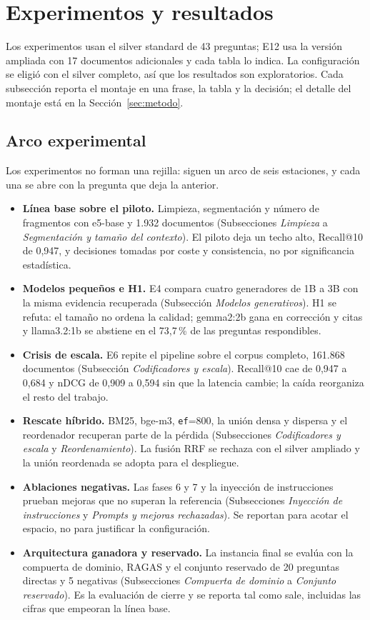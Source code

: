 \section{Experimentos y resultados}
\label{sec:experimentos}

Los experimentos usan el silver standard de 43 preguntas; E12 usa la versi\'on ampliada con 17 documentos adicionales y cada tabla lo indica. La configuraci\'on se eligi\'o con el silver completo, as\'i que los resultados son exploratorios. Cada subsecci\'on reporta el montaje en una frase, la tabla y la decisi\'on; el detalle del montaje est\'a en la Secci\'on~\ref{sec:metodo}.

\subsection{Arco experimental}

Los experimentos no forman una rejilla: siguen un arco de seis estaciones, y cada una se abre con la pregunta que deja la anterior.

\begin{itemize}
\item \textbf{L\'inea base sobre el piloto.} Limpieza, segmentaci\'on y n\'umero de fragmentos con e5-base y 1.932 documentos (Subsecciones \emph{Limpieza} a \emph{Segmentaci\'on y tama\~no del contexto}). El piloto deja un techo alto, Recall@10 de 0,947, y decisiones tomadas por coste y consistencia, no por significancia estad\'istica.
\item \textbf{Modelos peque\~nos e H1.} E4 compara cuatro generadores de 1B a 3B con la misma evidencia recuperada (Subsecci\'on \emph{Modelos generativos}). H1 se refuta: el tama\~no no ordena la calidad; gemma2:2b gana en correcci\'on y citas y llama3.2:1b se abstiene en el 73,7\,\% de las preguntas respondibles.
\item \textbf{Crisis de escala.} E6 repite el pipeline sobre el corpus completo, 161.868 documentos (Subsecci\'on \emph{Codificadores y escala}). Recall@10 cae de 0,947 a 0,684 y nDCG de 0,909 a 0,594 sin que la latencia cambie; la ca\'ida reorganiza el resto del trabajo.
\item \textbf{Rescate h\'ibrido.} BM25, bge-m3, \texttt{ef}=800, la uni\'on densa y dispersa y el reordenador recuperan parte de la p\'erdida (Subsecciones \emph{Codificadores y escala} y \emph{Reordenamiento}). La fusi\'on RRF se rechaza con el silver ampliado y la uni\'on reordenada se adopta para el despliegue.
\item \textbf{Ablaciones negativas.} Las fases 6 y 7 y la inyecci\'on de instrucciones prueban mejoras que no superan la referencia (Subsecciones \emph{Inyecci\'on de instrucciones} y \emph{Prompts y mejoras rechazadas}). Se reportan para acotar el espacio, no para justificar la configuraci\'on.
\item \textbf{Arquitectura ganadora y reservado.} La instancia final se eval\'ua con la compuerta de dominio, RAGAS y el conjunto reservado de 20 preguntas directas y 5 negativas (Subsecciones \emph{Compuerta de dominio} a \emph{Conjunto reservado}). Es la evaluaci\'on de cierre y se reporta tal como sale, incluidas las cifras que empeoran la l\'inea base.
\end{itemize}

